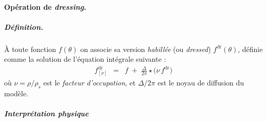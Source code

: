


\paragraph{Opération de \emph{dressing}.}
\subparagraph{Définition.}
À toute fonction $f(\theta)$ on associe sa version \emph{habillée} (ou \emph{dressed}) $f^{\mathrm{dr}}(\theta)$, définie comme la solution de l’équation intégrale suivante :
\begin{eqnarray}
	f^{\mathrm{dr}}_{[\nu]} & = & f  \;+\;\tfrac{\Delta}{2\pi}\star\bigl(\nu\,f^{\mathrm{dr}}\bigr) \label{eq:dressing}	
\end{eqnarray}
où $\nu = \rho/\rho_s$ est le \emph{facteur d’occupation}, et $\Delta/2\pi$ est le noyau de diffusion du modèle.


\subparagraph{Interprétation physique}


